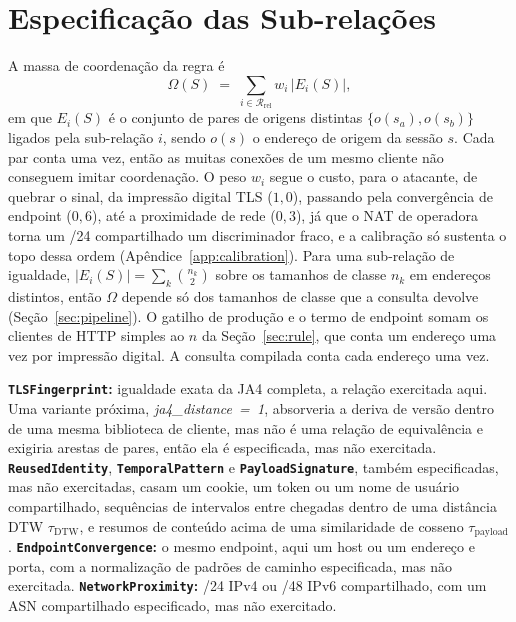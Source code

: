 \documentclass[conference,letterpaper,10pt]{IEEEtran}
\newcommand\1{\textit{(i)}}
\newcommand\2{\textit{(ii)}}
\newcommand\3{\textit{(iii)}}
\begin{document}
\section{Especificação das Sub-relações}
\label{app:algorithms}

A massa de coordenação da regra é \begin{equation} \Omega(S) \;=\; \sum_{i \in \mathcal{R}_{\mathrm{rel}}} w_i \,\big|E_i(S)\big| , \label{eq:omega} \end{equation} em que $E_i(S)$ é o conjunto de pares de origens distintas $\{o(s_a), o(s_b)\}$ ligados pela sub-relação $i$, sendo $o(s)$ o endereço de origem da sessão $s$. Cada par conta uma vez, então as muitas conexões de um mesmo cliente não conseguem imitar coordenação. O peso $w_i$ segue o custo, para o atacante, de quebrar o sinal, da impressão digital TLS ($1{,}0$), passando pela convergência de endpoint ($0{,}6$), até a proximidade de rede ($0{,}3$), já que o NAT de operadora torna um /24 compartilhado um discriminador fraco, e a calibração só sustenta o topo dessa ordem (Apêndice~\ref{app:calibration}). Para uma sub-relação de igualdade, $|E_i(S)| = \sum_k \binom{n_k}{2}$ sobre os tamanhos de classe $n_k$ em endereços distintos, então $\Omega$ depende só dos tamanhos de classe que a consulta devolve (Seção~\ref{sec:pipeline}). O gatilho de produção e o termo de endpoint somam os clientes de HTTP simples ao $n$ da Seção~\ref{sec:rule}, que conta um endereço uma vez por impressão digital. A consulta compilada conta cada endereço uma vez.

\textbf{\texttt{TLSFingerprint}:} igualdade exata da JA4 completa, a relação exercitada aqui. Uma variante próxima, \mbox{\textit{ja4\_distance = 1}}, absorveria a deriva de versão dentro de uma mesma biblioteca de cliente, mas não é uma relação de equivalência e exigiria arestas de pares, então ela é especificada, mas não exercitada. \textbf{\texttt{ReusedIdentity}}, \textbf{\texttt{TemporalPattern}} e \textbf{\texttt{PayloadSignature}}, também especificadas, mas não exercitadas, casam um cookie, um token ou um nome de usuário compartilhado, sequências de intervalos entre chegadas dentro de uma distância DTW $\tau_{\mathrm{DTW}}$, e resumos de conteúdo acima de uma similaridade de cosseno $\tau_{\mathrm{payload}}$. \textbf{\texttt{EndpointConvergence}:} o mesmo endpoint, aqui um host ou um endereço e porta, com a normalização de padrões de caminho especificada, mas não exercitada. \textbf{\texttt{NetworkProximity}:} /24 IPv4 ou /48 IPv6 compartilhado, com um ASN compartilhado especificado, mas não exercitado.
\end{document}
